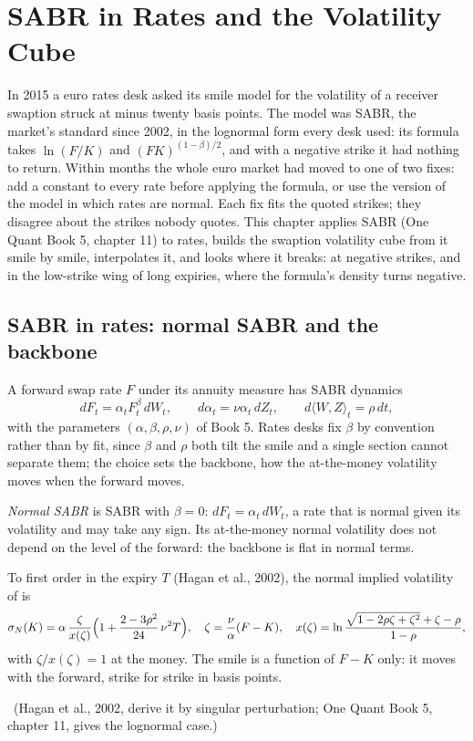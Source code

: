 \chapter{SABR in Rates and the Volatility Cube}\label{ch:rc:sabr-in-rates-and-the-volatility-cube}

In 2015 a euro rates desk asked its smile model for the volatility of a
receiver swaption struck at minus twenty basis points. The model was SABR, the
market's standard since 2002, in the lognormal form every desk used: its
formula takes $\ln(F/K)$ and $(FK)^{(1-\beta)/2}$, and with a negative strike it
had nothing to return. Within months the whole euro market had moved to one of
two fixes: add a constant to every rate before applying the formula, or use the
version of the model in which rates are normal. Each fix fits the quoted
strikes; they disagree about the strikes nobody quotes. This chapter applies
SABR (One Quant Book 5, chapter 11) to rates, builds the swaption volatility
cube from it smile by smile, interpolates it, and looks where it breaks: at
negative strikes, and in the low-strike wing of long expiries, where the
formula's density turns negative.

\section{SABR in rates: normal SABR and the backbone}

A forward swap rate $F$ under its annuity measure has SABR dynamics
\[
dF_t = \alpha_t F_t^{\beta}\,dW_t,\qquad d\alpha_t = \nu\alpha_t\,dZ_t,\qquad
d\langle W,Z\rangle_t = \rho\,dt ,
\]
with the parameters $(\alpha,\beta,\rho,\nu)$ of Book 5. Rates desks fix
$\beta$ by convention rather than by fit, since $\beta$ and $\rho$ both tilt the
smile and a single section cannot separate them; the choice sets the
backbone, how the at-the-money volatility moves when the forward moves.

\begin{definition}\label{def:rc:sabr-in-rates-and-the-volatility-cube:normal}
\emph{Normal SABR} is SABR with $\beta=0$: $dF_t=\alpha_t\,dW_t$,
a rate that is normal given its volatility and may take any sign. Its
at-the-money normal volatility does not depend on the level of the forward:
the backbone is flat in normal terms.
\end{definition}

\begin{proposition}\label{prop:rc:sabr-in-rates-and-the-volatility-cube:normalexp}
To first order in the expiry $T$ (Hagan et al., 2002), the normal implied
volatility of  is
\[
\sigma_N(K) = \alpha\,\frac{\zeta}{x(\zeta)}\Bigl(1+\frac{2-3\rho^2}{24}\,\nu^2T\Bigr),
\quad \zeta = \frac{\nu}{\alpha}(F-K),\quad
x(\zeta) = \ln\frac{\sqrt{1-2\rho\zeta+\zeta^2}+\zeta-\rho}{1-\rho},
\]
with $\zeta/x(\zeta)=1$ at the money. The smile is a function of $F-K$ only:
it moves with the forward, strike for strike in basis points.
\end{proposition}
\admitted\ (Hagan et al., 2002, derive it by singular perturbation; One Quant
Book 5, chapter 11, gives the lognormal case.)

